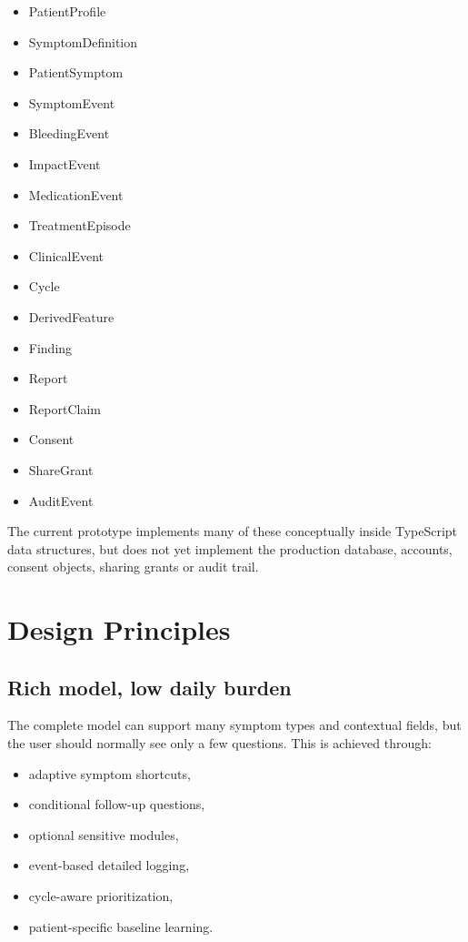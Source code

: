 \documentclass[11pt,a4paper]{article}
\begin{document}
\begin{itemize}
  \item PatientProfile
  \item SymptomDefinition
  \item PatientSymptom
  \item SymptomEvent
  \item BleedingEvent
  \item ImpactEvent
  \item MedicationEvent
  \item TreatmentEpisode
  \item ClinicalEvent
  \item Cycle
  \item DerivedFeature
  \item Finding
  \item Report
  \item ReportClaim
  \item Consent
  \item ShareGrant
  \item AuditEvent
\end{itemize}

The current prototype implements many of these conceptually inside TypeScript data structures, but does not yet implement the production database, accounts, consent objects, sharing grants or audit trail.

\section{Design Principles}

\subsection{Rich model, low daily burden}

The complete model can support many symptom types and contextual fields, but the user should normally see only a few questions. This is achieved through:

\begin{itemize}
  \item adaptive symptom shortcuts,
  \item conditional follow-up questions,
  \item optional sensitive modules,
  \item event-based detailed logging,
  \item cycle-aware prioritization,
  \item patient-specific baseline learning.
\end{itemize}
\end{document}
